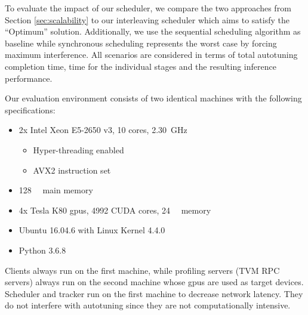 To evaluate the impact of our scheduler, we compare the two approaches from Section \ref{sec:scalability} to our interleaving scheduler which aims to satisfy the \enquote{Optimum} solution. Additionally, we use the sequential scheduling algorithm as baseline while synchronous scheduling represents the worst case by forcing maximum interference. All scenarios are considered in terms of total autotuning completion time, time for the individual stages and the resulting inference performance.

Our evaluation environment consists of two identical machines with the following specifications:
\begin{itemize}
	\item 2x Intel Xeon E5-2650 v3, 10 cores, \SI{2.30}{\giga\hertz}
	\begin{itemize}
		\item Hyper-threading enabled
		\item AVX2 instruction set
	\end{itemize}
	\item \SI{128}{\giga\byte} main memory
	\item 4x Tesla K80 \glspl{gpu}, 4992 CUDA cores, \SI{24}{\giga\byte} memory
	\item Ubuntu 16.04.6 with Linux Kernel 4.4.0
	\item Python 3.6.8
\end{itemize}

Clients always run on the first machine, while profiling servers (TVM RPC servers) always run on the second machine whose \glspl{gpu} are used as target devices. Scheduler and tracker run on the first machine to decrease network latency. They do not interfere with autotuning since they are not computationally intensive.

